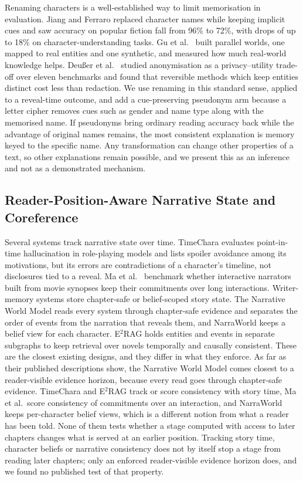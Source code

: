 \documentclass[sn-mathphys]{sn-jnl}%
\theoremstyle{thmstyleone}%
\theoremstyle{thmstyletwo}%
\theoremstyle{thmstylethree}%
\begin{document}
Renaming characters is a well-established way to limit memorisation in evaluation. Jiang and Ferraro \cite{jiang2024beyond} replaced character names while keeping implicit cues and saw accuracy on popular fiction fall from 96\% to 72\%, with drops of up to 18\% on character-understanding tasks. Gu et al.\ \cite{gu2026synthworlds} built parallel worlds, one mapped to real entities and one synthetic, and measured how much real-world knowledge helps. Deußer et al.\ \cite{deusser2026anonymization} studied anonymisation as a privacy--utility trade-off over eleven benchmarks and found that reversible methods which keep entities distinct cost less than redaction. We use renaming in this standard sense, applied to a reveal-time outcome, and add a cue-preserving pseudonym arm because a letter cipher removes cues such as gender and name type along with the memorised name. If pseudonyms bring ordinary reading accuracy back while the advantage of original names remains, the most consistent explanation is memory keyed to the specific name. Any transformation can change other properties of a text, so other explanations remain possible, and we present this as an inference and not as a demonstrated mechanism.

\subsection{Reader-Position-Aware Narrative State and Coreference}\label{sec:rw-state}

Several systems track narrative state over time. TimeChara \cite{ahn2024timechara} evaluates point-in-time hallucination in role-playing models and lists spoiler avoidance among its motivations, but its errors are contradictions of a character's timeline, not disclosures tied to a reveal. Ma et al.\ \cite{ma2026script} benchmark whether interactive narrators built from movie synopses keep their commitments over long interactions. Writer-memory systems store chapter-safe or belief-scoped story state. The Narrative World Model \cite{saifullah2026nwm} reads every system through chapter-safe evidence and separates the order of events from the narration that reveals them, and NarraWorld \cite{tian2026narraworld} keeps a belief view for each character. E$^2$RAG \cite{zhang2025e2rag} holds entities and events in separate subgraphs to keep retrieval over novels temporally and causally consistent. These are the closest existing designs, and they differ in what they enforce. As far as their published descriptions show, the Narrative World Model comes closest to a reader-visible evidence horizon, because every read goes through chapter-safe evidence. TimeChara and E$^2$RAG track or score consistency with story time, Ma et al.\ score consistency of commitments over an interaction, and NarraWorld keeps per-character belief views, which is a different notion from what a reader has been told. None of them tests whether a stage computed with access to later chapters changes what is served at an earlier position. Tracking story time, character beliefs or narrative consistency does not by itself stop a stage from reading later chapters; only an enforced reader-visible evidence horizon does, and we found no published test of that property.
\end{document}
